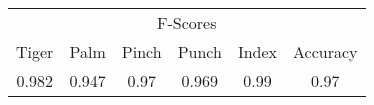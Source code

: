 \documentclass{standalone}
\begin{document}
 
 \begin{tabular}{|c|c|c|c|c ||c|}
\cline{1-6}\multicolumn{6}{|c|}{F-Scores} \\ 
\cline{1-6}Tiger & Palm & Pinch & Punch & Index & Accuracy\\ 
\cline{1-6}0.982 & 0.947 & 0.97 & 0.969 & 0.99 & 0.97\\ 
 \cline{1-6}\hline \end{tabular}
 
\end{document}
